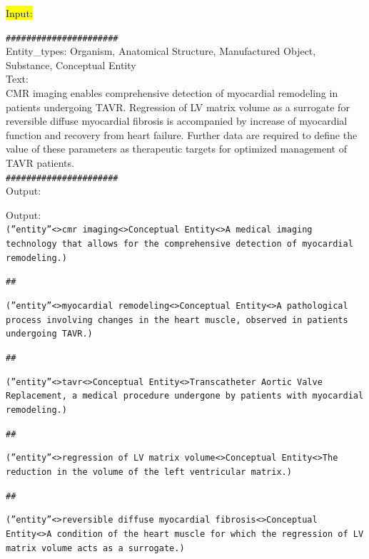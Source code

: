 \documentclass[10pt]{article}
\begin{document}
\begin{appendices}
\begin{tcolorbox}
\colorbox{Yellow}{Input:}\\
\begin{mdframed}[backgroundcolor=Yellow!20,skipabove=1em,skipbelow=1em,]
\texttt{\#\#\#\#\#\#\#\#\#\#\#\#\#\#\#\#\#\#\#\#\#\#}\\
Entity\_types: Organism, Anatomical Structure, Manufactured Object, Substance, Conceptual Entity\\
Text:\\
CMR imaging enables comprehensive detection of myocardial remodeling in patients undergoing TAVR. Regression of LV matrix volume as a surrogate for reversible diffuse myocardial fibrosis is accompanied by increase of myocardial function and recovery from heart failure. Further data are required to define the value of these parameters as therapeutic targets for optimized management of TAVR patients.\\
\texttt{\#\#\#\#\#\#\#\#\#\#\#\#\#\#\#\#\#\#\#\#\#\#}\\
Output:
\end{mdframed}

Output:\\
\texttt{(''entity''\textless\textbar\textgreater cmr imaging\textless\textbar\textgreater Conceptual Entity\textless\textbar\textgreater A medical imaging technology that allows for the comprehensive detection of myocardial remodeling.)}

\texttt{\#\#}

\texttt{(''entity''\textless\textbar\textgreater myocardial remodeling\textless\textbar\textgreater Conceptual Entity\textless\textbar\textgreater A pathological process involving changes in the heart muscle, observed in patients undergoing TAVR.)}

\texttt{\#\#}

\texttt{(''entity''\textless\textbar\textgreater tavr\textless\textbar\textgreater Conceptual Entity\textless\textbar\textgreater Transcatheter Aortic Valve Replacement, a medical procedure undergone by patients with myocardial remodeling.)}

\texttt{\#\#}

\texttt{(''entity''\textless\textbar\textgreater regression of LV matrix volume\textless\textbar\textgreater Conceptual Entity\textless\textbar\textgreater The reduction in the volume of the left ventricular matrix.)}

\texttt{\#\#}

\texttt{(''entity''\textless\textbar\textgreater reversible diffuse myocardial fibrosis\textless\textbar\textgreater Conceptual Entity\textless\textbar\textgreater A condition of the heart muscle for which the regression of LV matrix volume acts as a surrogate.)}


\end{tcolorbox}
\end{appendices}
\end{document}
